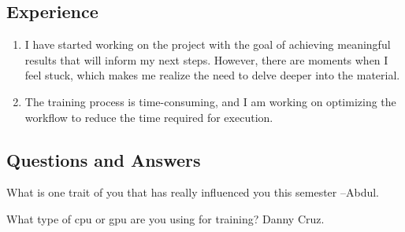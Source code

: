 \subsection*{Experience}

\begin{enumerate}
    \item I have started working on the project with the goal of achieving meaningful results that will inform my next steps. However, there are moments when I feel stuck, which makes me realize the need to delve deeper into the material.
    
    \item The training process is time-consuming, and I am working on optimizing the workflow to reduce the time required for execution.
\end{enumerate}

\subsection*{Questions and Answers}
What is one trait of you that has really influenced you this semester  --Abdul.

What type of cpu or gpu are you using for training? Danny Cruz.
